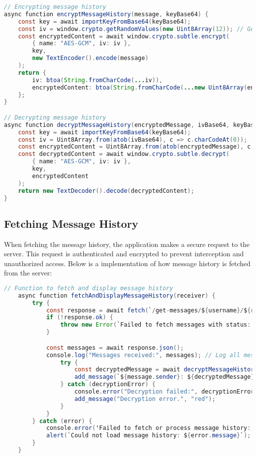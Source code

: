 \documentclass{article}
\begin{document}
\begin{lstlisting}[language=Java]
// Encrypting message history
async function encryptMessageHistory(message, keyBase64) {
    const key = await importKeyFromBase64(keyBase64);
    const iv = window.crypto.getRandomValues(new Uint8Array(12)); // Generate a random IV
    const encryptedContent = await window.crypto.subtle.encrypt(
        { name: "AES-GCM", iv: iv },
        key,
        new TextEncoder().encode(message)
    );
    return {
        iv: btoa(String.fromCharCode(...iv)),
        encryptedContent: btoa(String.fromCharCode(...new Uint8Array(encryptedContent)))
    };
}

// Decrypting message history
async function decryptMessageHistory(encryptedMessage, ivBase64, keyBase64) {
    const key = await importKeyFromBase64(keyBase64);
    const iv = Uint8Array.from(atob(ivBase64), c => c.charCodeAt(0));
    const encryptedContent = Uint8Array.from(atob(encryptedMessage), c => c.charCodeAt(0));
    const decryptedContent = await window.crypto.subtle.decrypt(
        { name: "AES-GCM", iv: iv },
        key,
        encryptedContent
    );
    return new TextDecoder().decode(decryptedContent);
}
\end{lstlisting}

\subsection*{Fetching Message History}
When fetching the message history, the application makes a secure request to the server. This request is authenticated and encrypted to prevent interception and unauthorized access. Below is a  implementation of how message history is fetched from the server:

\begin{lstlisting}[language=Java]
// Function to fetch and display message history
    async function fetchAndDisplayMessageHistory(receiver) {
        try {
            const response = await fetch(`/get-messages/${username}/${receiver}`);
            if (!response.ok) {
                throw new Error(`Failed to fetch messages with status: ${response.status}`);
            }

            const messages = await response.json();
            console.log("Messages received:", messages); // Log all messages to see what's fetched
                try {
                    const decryptedMessage = await decryptMessageHistory(message.encryptedMessage, message.iv, sessionStorage.getItem("key"));
                    add_message(`${message.sender}: ${decryptedMessage}`, "grey");
                } catch (decryptionError) {
                    console.error("Decryption failed:", decryptionError);
                    add_message("Decryption error.", "red");
                }
            }
        } catch (error) {
            console.error('Failed to fetch or process message history:', error);
            alert(`Could not load message history: ${error.message}`);
        }
    }
\end{lstlisting}
\end{document}
